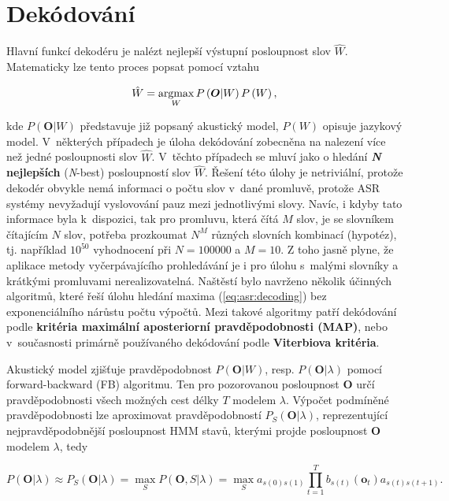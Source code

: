 \section{Dekódování}
\label{chap:asr:decoding}

Hlavní funkcí dekodéru je nalézt nejlepší výstupní posloupnost slov $\hat{W}$. Matematicky lze tento proces popsat pomocí vztahu

\begin{equation}
  \hat{W} = \operatorname*{argmax}_{W} P\left(\boldsymbol{O} | W\right)P\left(W\right),
  \label{eq:asr:decoding:decoder}
\end{equation}

\noindent kde $P\left(\boldsymbol{O}|W\right)$ představuje již popsaný akustický model, $P\left(W\right)$ opisuje jazykový model. V~některých případech je úloha dekódování zobecněna na nalezení více než jedné posloupnosti slov $\hat{W}$. V~těchto případech se mluví jako o hledání \textbf{\textit{N} nejlepších} (\textit{N}-best) posloupností slov $\hat{W}$.  Řešení této úlohy je netriviální, protože dekodér obvykle nemá informaci o počtu slov v~dané promluvě, protože ASR systémy nevyžadují vyslovování pauz mezi jednotlivými slovy. Navíc, i kdyby tato informace byla  k~dispozici, tak pro promluvu, která čítá $M$ slov, je se slovníkem čítajícím $N$ slov, potřeba prozkoumat $N^{M}$ různých slovních kombinací (hypotéz), tj. například $10^{50}$ vyhodnocení při $N=100000$ a $M=10$. Z toho jasně plyne, že aplikace metody vyčerpávajícího prohledávání je i pro úlohu s~malými slovníky a krátkými promluvami nerealizovatelná.
Naštěstí bylo navrženo několik účinných algoritmů, které řeší úlohu hledání maxima (\ref{eq:asr:decoding}) bez exponenciálního nárůstu počtu výpočtů. Mezi takové algoritmy patří dekódování podle \textbf{kritéria maximální aposteriorní pravděpodobnosti (MAP)}, nebo v~současnosti primárně používaného dekódování podle \textbf{Viterbiova kritéria}.

Akustický model zjišťuje pravděpodobnost $P\left(\boldsymbol{O}|W\right)$, resp. $P\left(\boldsymbol{O}|\lambda\right)$ pomocí forward-backward (FB) algoritmu.
Ten pro pozorovanou posloupnost $\boldsymbol{O}$ určí pravděpodobnosti všech možných cest délky $T$ modelem $\lambda$.
Výpočet podmíněné pravděpodobnosti lze aproximovat pravděpodobností $P_S(\boldsymbol{O}|\lambda)$, reprezentující nejpravděpodobnější posloupnost HMM stavů, kterými projde posloupnost $\boldsymbol{O}$ modelem $\lambda$, tedy

\begin{equation}
  P\left(\boldsymbol{O}|\lambda\right) \approx P_S\left(\boldsymbol{O}|\lambda\right) = \max_S P\left(\boldsymbol{O}, S| \lambda \right) = \max_S a_{s\left(0\right)s\left(1\right)} \prod_{t=1}^{T} b_{s\left(t\right)}\left(\boldsymbol{o}_t\right) a_{s\left(t\right)s\left(t+1\right)}.
  \label{eq:asr:decoding:approx}
\end{equation}

